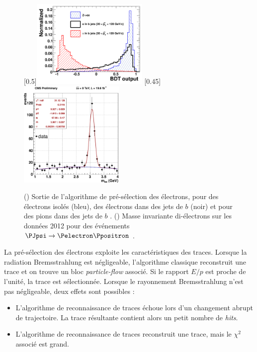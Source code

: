 \begin{figure}[tbp]
    \centering
    \subcaptionbox{\label{fig:bdt_electron}}[0.5\textwidth]{\includegraphics[width=0.5\textwidth]{chapitre3/figs/bdt_electron.pdf}} \hfill
    \subcaptionbox{\label{fig:jspi_ee}}[0.45\textwidth]{\includegraphics[width=0.45\textwidth]{chapitre3/figs/jspi_ee.pdf}}
    \caption{() Sortie de l'algorithme de pré-sélection des électrons, pour des électrons isolés (bleu), des électrons dans des jets de $b$ (noir) et pour des pions dans des jets de $b$ \citep{pf}. () Masse invariante di-électrons sur les données 2012 pour des événements $\PJpsi \rightarrow \Pelectron \Ppositron$ \citep{cms_electron_perf}.}
    \label{fig:electron_perf}
\end{figure}

La pré-sélection des électrons exploite les caractéristiques des traces. Lorsque la radiation Bremsstrahlung est négligeable, l'algorithme classique reconstruit une trace et on trouve un bloc \emph{particle-flow} associé. Si le rapport $E/p$ est proche de l'unité, la trace est sélectionnée. Lorsque le rayonnement Bremsstrahlung n'est pas négligeable, deux effets sont possibles :
\begin{itemize}
    \item L'algorithme de reconnaissance de traces échoue lors d'un changement abrupt de trajectoire. La trace résultante contient alors un petit nombre de \emph{hits}.
    \item L'algorithme de reconnaissance de traces reconstruit une trace, mais le $\chi^2$ associé est grand.
\end{itemize}

